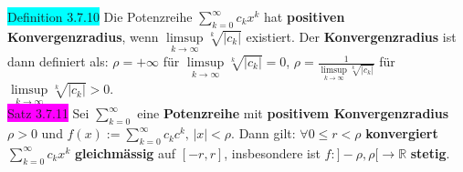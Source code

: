 \documentclass[landscape, 10pt]{article}
\newcommand{\R}{\mathbb{R}}
\begin{document}
\begin{multicols}{3}
              \colorbox{cyan}{Definition 3.7.10} 
                     Die Potenzreihe 
                     \textcolor{NavyBlue}{$\sum_{k=0}^\infty c_kx^k$}
                     hat \textbf{positiven Konvergenzradius}, wenn 
                     \textcolor{NavyBlue}{
                     $\limsup\limits_{k\to\infty}\sqrt[k]{|c_k|}$} 
                     existiert. 
                     Der \textbf{Konvergenzradius} ist dann definiert als: 
                     \textcolor{NavyBlue}{$\rho=+\infty$} für
                     \textcolor{NavyBlue}{
                     $\limsup\limits_{k\to\infty}\sqrt[k]{|c_k|}=0$},
                     \textcolor{NavyBlue}{
                     $\rho=\frac{1}{\limsup\limits_{k\to\infty}\sqrt[k]{|c_k|}}$}
                     für \textcolor{NavyBlue}{
                     $\limsup\limits_{k\to\infty}\sqrt[k]{|c_k|}>0$}.\\
              \colorbox{magenta}{Satz 3.7.11} 
                     Sei \textcolor{NavyBlue}{$\sum_{k=0}^\infty$}
                     eine \textbf{Potenzreihe} mit 
                     \textbf{positivem Konvergenzradius} 
                     \textcolor{NavyBlue}{$\rho>0$} und  
                     \textcolor{NavyBlue}{
                     $f(x):=\sum_{k=0}^\infty c_kc^k,\,|x|<\rho$}. 
                     Dann gilt: \textcolor{NavyBlue}{$\forall0\leqslant r<\rho$} 
                     \textbf{konvergiert} 
                     \textcolor{NavyBlue}{$\sum_{k=0}^\infty c_kx^k$} 
                     \textbf{gleichmässig} auf \textcolor{NavyBlue}{$[-r,r]$}, 
                     insbesondere 
                     ist \textcolor{NavyBlue}{$f:]-\rho,\rho[\longrightarrow\R$} 
                     \textbf{stetig}.

\end{multicols}
\end{document}
